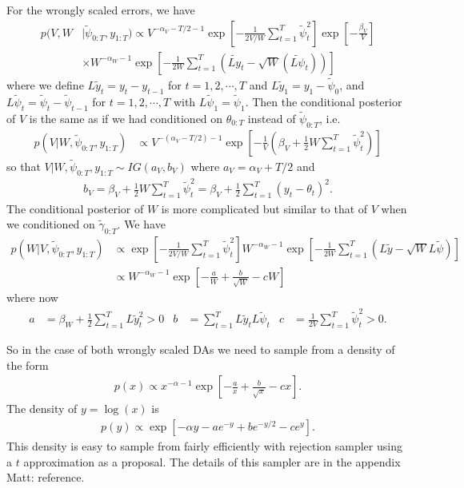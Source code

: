 \documentclass{article}
\newcommand{\matt}[1]{{\color{red} Matt: #1}}
\begin{document}
For the wrongly scaled errors, we have
\begin{align}
  p(V,W&|\tilde{\psi}_{0:T},y_{1:T}) \propto V^{-\alpha_V - T/2 -1}\exp\left[-\frac{1}{2V/W}\sum_{t=1}^T\tilde{\psi}_t^2\right]\exp\left[-\frac{\beta_V}{V}\right]\nonumber\\
  &\times W^{-\alpha_W-1}\exp\left[-\frac{1}{2W}\sum_{t=1}^T\left(\tilde{Ly}_t - \sqrt{W}(\tilde{L\psi}_t)\right)\right]\label{llmwerrorpost}
\end{align}
where we define $L\tilde{y}_t = y_t - y_{t-1}$ for $t=1,2,\cdots,T$ and $L\tilde{y}_1=y_1 - \tilde{\psi}_0$, and $L\tilde{\psi}_t=\tilde{\psi}_t-\tilde{\psi}_{t-1}$ for $t=1,2,\cdots,T$ with $L\tilde{\psi}_1=\tilde{\psi}_1$. Then the conditional posterior of $V$ is the same as if we had conditioned on $\theta_{0:T}$ instead of $\tilde{\psi}_{0:T}$, i.e.
\begin{align*}
  p(V|W,\tilde{\psi}_{0:T},y_{1:T}) & \propto V^{-(\alpha_V - T/2)-1}\exp\left[-\frac{1}{V}\left(\beta_V + \frac{1}{2}W\sum_{t=1}^T\tilde{\psi}_t^2\right)\right]
\end{align*}
so that $V|W,\tilde{\psi}_{0:T},y_{1:T}\sim IG(a_V, b_V)$ where $a_V = \alpha_V + T/2$ and
\begin{align*}
  b_V = \beta_V + \frac{1}{2}W\sum_{t=1}^T\tilde{\psi}_t^2 = \beta_V + \frac{1}{2}\sum_{t=1}^T(y_t - \theta_t)^2.
\end{align*}
The conditional posterior of $W$ is more complicated but similar to that of $V$ when we conditioned on $\tilde{\gamma}_{0:T}$. We have
\begin{align*}
  p(W|V,\tilde{\psi}_{0:T},y_{1:T}) &\propto \exp\left[-\frac{1}{2V/W}\sum_{t=1}^T\tilde{\psi}_t^2\right] W^{-\alpha_W-1}\exp\left[-\frac{1}{2W}\sum_{t=1}^T\left(L\tilde{y} - \sqrt{W}L\tilde{\psi}\right)\right]\\
  &\propto W^{-\alpha_W - 1}\exp\left[-\frac{a}{W} + \frac{b}{\sqrt{W}} - cW\right]
\end{align*}
where now
\begin{align*}
  a & = \beta_W + \frac{1}{2}\sum_{t=1}^TL\tilde{y}_t^2 > 0 & 
  b & = \sum_{t=1}^TL\tilde{y}_tL\tilde{\psi}_t &
  c & = \frac{1}{2V}\sum_{t=1}^T\tilde{\psi}_t^2 > 0.
\end{align*}

So in the case of both wrongly scaled DAs we need to sample from a density of the form
\begin{align*}
  p(x) \propto x^{-\alpha -1}\exp\left[-\frac{a}{x} + \frac{b}{\sqrt{x}} - cx\right].
\end{align*}
The density of $y=\log(x)$ is 
\begin{align*}
  p(y) \propto \exp\left[-\alpha y - ae^{-y} + be^{-y/2} - ce^y\right].
\end{align*}
This density is easy to sample from fairly efficiently with rejection sampler using a $t$ approximation as a proposal. The details of this sampler are in the appendix \matt{reference}.
\end{document}
